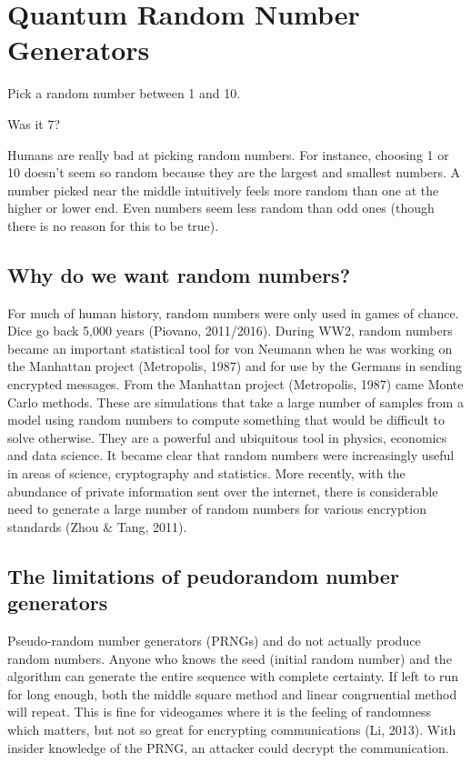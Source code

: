 \documentclass{book}
\begin{document}
\chapter{Quantum Random Number Generators}

Pick a random number between 1 and 10. 

Was it 7?    

Humans are really bad at picking random numbers. For instance, choosing 1 or 10 doesn’t seem so random because they are the largest and smallest numbers. A number picked near the middle intuitively feels more random than one at the higher or lower end. Even numbers seem less random than odd ones (though there is no reason for this to be true). 


\section{Why do we want random numbers?}

For much of human history, random numbers were only used in games of chance. Dice go back 5,000 years (Piovano, 2011/2016). During WW2, random numbers became an important statistical tool for von Neumann when he was working on the Manhattan project (Metropolis, 1987) and for use by the Germans in sending encrypted messages. 
From the Manhattan project (Metropolis, 1987) came Monte Carlo methods. These are simulations that take a large number of samples from a model using random numbers to compute something that would be difficult to solve otherwise. They are a powerful and ubiquitous tool in physics, economics and data science. It became clear that random numbers were increasingly useful in areas of science, cryptography and statistics. More recently, with the abundance of private information sent over the internet, there is considerable need to generate a large number of random numbers for various encryption standards (Zhou \& Tang, 2011).

\section{The limitations of peudorandom number generators} 


Pseudo-random number generators (PRNGs) and do not actually produce random numbers. Anyone who knows the seed (initial random number) and the algorithm can generate the entire sequence with complete certainty. If left to run for long enough, both the middle square method and linear congruential method will repeat. This is fine for videogames where it is the feeling of randomness which matters, but not so great for encrypting communications (Li, 2013). With insider knowledge of the PRNG, an attacker could decrypt the communication.
\end{document}
